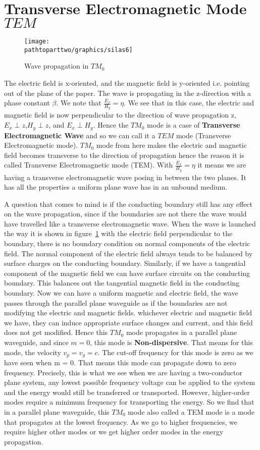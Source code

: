 \section{Transverse Electromagnetic Mode $TEM$}
\begin{figure}[h]
\centering
\texttt{[image: \\pathtoparttwo/graphics/silas6]}
\caption{Wave propagation in $TM_0$}
\label{fig:silas6}
\end{figure}
The electric field is x-oriented, and the magnetic field is y-oriented i.e. pointing out of the plane of the paper. The wave is propagating in the z-direction with a phase constant $\beta$. We note that $\frac{E_{x}}{H_{y}} = \eta$. We see that in this case, the electric and magnetic field is now perpendicular to the direction of wave propagation z, $E_{x}\perp z$,$H_{y}\perp z$, and $E_{x}\perp H_{y}$. Hence the $TM_0$ mode is a case of \textbf{Transverse Electromagnetic Wave} and so we can call it a $TEM$ mode (Transverse Electromagnetic mode). $TM_0$ mode from here makes the electric and magnetic field becomes transverse to the direction of propagation hence the reason it is called Transverse Electromagnetic mode (TEM). With $\frac{E_{x}}{H_{y}} = \eta$ it means we are having a transverse electromagnetic wave posing in between the two planes. It has all the properties a uniform plane wave has in an unbound medium.

A question that comes to mind is if the conducting boundary still has any effect on the wave propagation, since if the boundaries are not there the wave would have travelled like a transverse electromagnetic wave. When the wave is launched the way it is shown in figure~\ref{fig:silas6} with the electric field perpendicular to the boundary, there is no boundary condition on normal components of the electric field. The normal component of the electric field always tends to be balanced by surface charges on the conducting boundary. Similarly, if we have a tangential component of the magnetic field we can have surface circuits on the conducting boundary. This balances out the tangential magnetic field in the conducting boundary. Now we can have a uniform magnetic and electric field, the wave passes through the parallel plane waveguide as if the boundaries are not modifying the electric and magnetic fields. whichever electric and magnetic field we have, they can induce appropriate surface changes and current, and this field does not get modified. Hence this $TM_0$ mode propagates in a parallel plane waveguide, and since $m = 0$, this mode is \textbf{Non-dispersive}. That means for this mode, the velocity $v_{p}=v_{g}=c$. The cut-off frequency for this mode is zero as we have seen when m = 0. That means this mode can propagate down to zero frequency. Precisely, this is what we see when we are having a two-conductor plane system, any lowest possible frequency voltage can be applied to the system and the energy would still be transferred or transported. However, higher-order modes require a minimum frequency for transporting the energy. So we find that in a parallel plane waveguide, this $TM_0$ mode also called a TEM mode is a mode that propagates at the lowest frequency. As we go to higher frequencies, we require higher other modes or we get higher order modes in the energy propagation.
